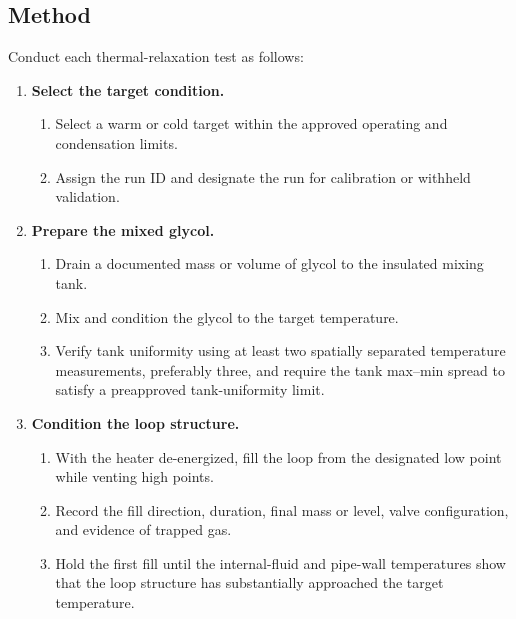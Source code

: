 \documentclass[11pt]{article}
\begin{document}
\subsection{Method}

Conduct each thermal-relaxation test as follows:

\begin{enumerate}
    \item \textbf{Select the target condition.}
    \begin{enumerate}
        \item Select a warm or cold target within the approved operating and condensation limits.
        \item Assign the run ID and designate the run for calibration or withheld validation.
    \end{enumerate}

    \item \textbf{Prepare the mixed glycol.}
    \begin{enumerate}
        \item Drain a documented mass or volume of glycol to the insulated mixing tank.
        \item Mix and condition the glycol to the target temperature.
        \item Verify tank uniformity using at least two spatially separated temperature measurements, preferably three, and require the tank max--min spread to satisfy a preapproved tank-uniformity limit.
    \end{enumerate}

    \item \textbf{Condition the loop structure.}
    \begin{enumerate}
        \item With the heater de-energized, fill the loop from the designated low point while venting high points.
        \item Record the fill direction, duration, final mass or level, valve configuration, and evidence of trapped gas.
        \item Hold the first fill until the internal-fluid and pipe-wall temperatures show that the loop structure has substantially approached the target temperature.
    \end{enumerate}


\end{enumerate}
\end{document}
